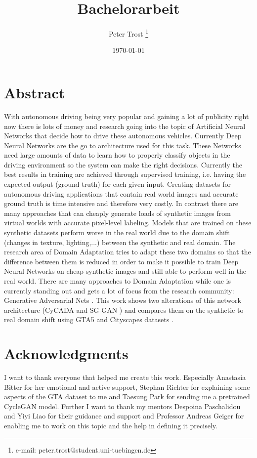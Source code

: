 \documentclass[a4paper,cleardoubleempty,BCOR1cm]{scrbook}
\title{Bachelorarbeit}
\author{Peter Trost \thanks{e-mail: peter.trost@student.uni-tuebingen.de}}
\date{\today}
\begin{document}


\chapter*{Abstract}
With autonomous driving being very popular and gaining a lot of publicity right now there is lots of money and research going into the topic of Artificial Neural Networks that decide how to drive these autonomous vehicles. Currently Deep Neural Networks are the go to architecture used for this task. These Networks need large amounts of data to learn how to properly classify objects in the driving environment so the system can make the right decisions. Currently the best results in training are achieved through supervised training, i.e. having the expected output (ground truth) for each given input. Creating datasets for autonomous driving applications that contain real world images and accurate ground truth is time intensive and therefore very costly. In contrast there are many approaches that can cheaply generate loads of synthetic images from virtual worlds with accurate pixel-level labeling. Models that are trained on these synthetic datasets perform worse in the real world due to the domain shift (changes in texture, lighting,...) between the synthetic and real domain. The research area of Domain Adaptation tries to adapt these two domains so that the difference between them is reduced in order to make it possible to train Deep Neural Networks on cheap synthetic images and still able to perform well in the real world. There are many approaches to Domain Adaptation while one is currently standing out and gets a lot of focus from the research community: Generative Adversarial Nets \cite{NIPS2014_5423}. This work shows two alterations of this network architecture (CyCADA \cite{DBLP:journals/corr/abs-1711-03213} and SG-GAN \cite{DBLP:journals/corr/abs-1801-01726}) and compares them on the synthetic-to-real domain shift using GTA5 \cite{Richter_2016_ECCV} and Cityscapes datasets \cite{Cordts_2016_CVPR}.


\chapter*{Acknowledgments}
I want to thank everyone that helped me create this work. Especially Anastasia Bitter for her emotional and active support, Stephan Richter for explaining some aspects of the GTA dataset to me and Taesung Park for sending me a pretrained CycleGAN model. Further I want to thank my mentors Despoina Paschalidou and Yiyi Liao for their guidance and support and Professor Andreas Geiger for enabling me to work on this topic and the help in defining it precisely.
\end{document}
